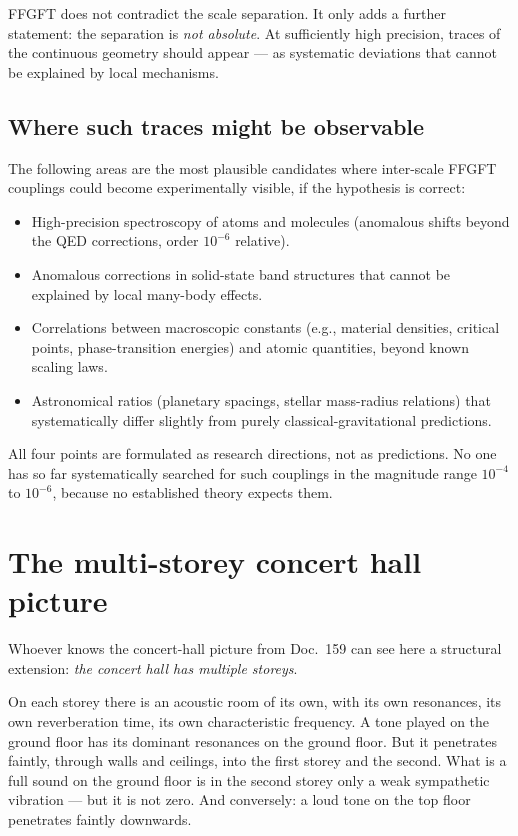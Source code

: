 FFGFT does not contradict the scale separation. It only adds a
further statement: the separation is \emph{not absolute}. At
sufficiently high precision, traces of the continuous geometry should
appear --- as systematic deviations that cannot be explained by local
mechanisms.

\subsection*{Where such traces might be observable}

The following areas are the most plausible candidates where
inter-scale FFGFT couplings could become experimentally visible, if
the hypothesis is correct:

\begin{itemize}\setlength\itemsep{2pt}
  \item High-precision spectroscopy of atoms and molecules
        (anomalous shifts beyond the QED corrections, order $10^{-6}$
        relative).
  \item Anomalous corrections in solid-state band structures that
        cannot be explained by local many-body effects.
  \item Correlations between macroscopic constants (e.g., material
        densities, critical points, phase-transition energies) and
        atomic quantities, beyond known scaling laws.
  \item Astronomical ratios (planetary spacings, stellar
        mass-radius relations) that systematically differ slightly
        from purely classical-gravitational predictions.
\end{itemize}

All four points are formulated as research directions, not as
predictions. No one has so far systematically searched for such
couplings in the magnitude range $10^{-4}$ to $10^{-6}$, because no
established theory expects them.

\section{The multi-storey concert hall picture}

Whoever knows the concert-hall picture from Doc.~159 can see here a
structural extension: \emph{the concert hall has multiple storeys}.

On each storey there is an acoustic room of its own, with its own
resonances, its own reverberation time, its own characteristic
frequency. A tone played on the ground floor has its dominant
resonances on the ground floor. But it penetrates faintly, through
walls and ceilings, into the first storey and the second. What is a
full sound on the ground floor is in the second storey only a weak
sympathetic vibration --- but it is not zero. And conversely: a loud
tone on the top floor penetrates faintly downwards.

